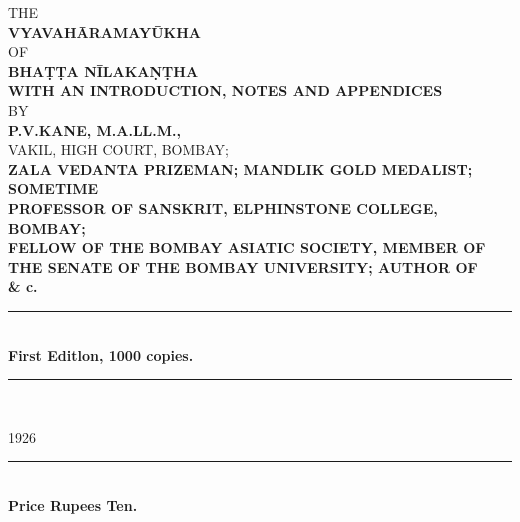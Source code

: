\documentclass[11pt, openany]{book}
\begin{document}
\thispagestyle{empty}

\begin{center}
{\large THE}\\

\vspace{5mm}
\textbf{\Huge VYAVAHĀRAMAYŪKHA}\\

\vspace{5mm}
{\large OF}\\

\vspace{5mm}
\textbf{\huge BHAṬṬA NĪLAKAṆṬHA}\\

\vspace{3mm}
\textbf{WITH AN INTRODUCTION, NOTES AND APPENDICES}\\

\vspace{4mm}
BY\\

\vspace{4mm}
\textbf{\Large P.V.KANE, M.A.LL.M.,}\\

\vspace{4mm}
VAKIL, HIGH COURT, BOMBAY;\\

\vspace{3mm}
\textbf{\en ZALA VEDANTA PRIZEMAN; MANDLIK GOLD MEDALIST; SOMETIME}\\

\vspace{3mm}
\textbf{\en PROFESSOR OF SANSKRIT, ELPHINSTONE COLLEGE, BOMBAY;}\\

\vspace{3mm}
\textbf{\en FELLOW OF THE BOMBAY ASIATIC SOCIETY, MEMBER OF}\\

\vspace{3mm}
\textbf{\en THE SENATE OF THE BOMBAY UNIVERSITY; AUTHOR OF}\\

\vspace{3mm}
\textbf{ \& c.}\\

\vspace{8mm}
\rule{0.4\linewidth}{0.5pt}\\

\textbf{\large First Editlon, 1000 copies.}\\

\rule{0.4\linewidth}{0.5pt}\\

\vspace*{\fill}
\onehalfspacing

{\LARGE 1926}\\

\rule{0.2\linewidth}{0.5pt}\\

\textbf{\emph \Large \en Price Rupees Ten.}
\end{center}
\end{document}
